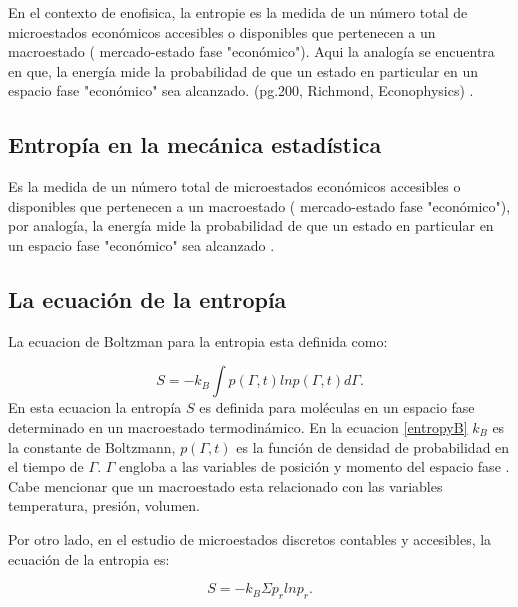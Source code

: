 
En el contexto de enofisica, la entropie es la medida de un número total de microestados económicos accesibles o disponibles que pertenecen a un macroestado ( mercado-estado fase "económico"). Aqui la analogía se encuentra en que, la energía mide la probabilidad de que un estado en particular en un espacio fase "económico" sea alcanzado. (pg.200, Richmond, Econophysics) \citep{cottrell_classical_2009}.

\subsection{Entropía en la mecánica estadística} 


Es la medida de un número total de microestados económicos accesibles o disponibles que pertenecen a un macroestado ( mercado-estado fase "económico"), por analogía, la energía mide la probabilidad de que un estado en particular en un espacio fase "económico" sea alcanzado \citep{richmond}.

\subsection{La ecuación de la entropía}

La ecuacion de Boltzman para la entropia esta definida como:

\begin{equation}
	S = -k_B \int p(\Gamma,t) ln p(\Gamma,t) d\Gamma.
	\label{entropyB}
\end{equation}
En esta ecuacion la entropía $S$ es definida para moléculas en un espacio fase determinado  en un macroestado termodinámico.
En la ecuacion \ref{entropyB} $k_B$ es la constante de Boltzmann, $ p(\Gamma,t)$ es la función de densidad de probabilidad en el tiempo de $\Gamma$. $\Gamma$ engloba a las variables de posición y momento del espacio fase \citep[][pagina 13]{richmond}. Cabe mencionar que un macroestado esta relacionado con las variables temperatura, presión, volumen.
 
Por otro lado, en el estudio de microestados discretos contables y accesibles, la ecuación de la entropia es: 
 
 \begin{equation}
 	S = -k_B \Sigma p_r ln p_r.
 \end{equation}  

